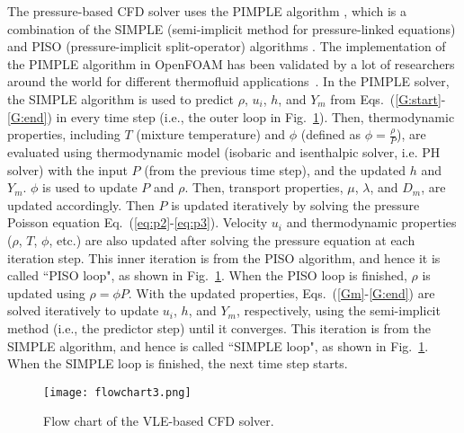 The pressure-based CFD solver uses the PIMPLE algorithm \cite{holzmann2016mathematics}, which is a combination of the SIMPLE (semi-implicit method for pressure-linked equations) \cite{patankar1983calculation} and PISO (pressure-implicit split-operator) algorithms \cite{issa1986solution}. The implementation of the PIMPLE algorithm in OpenFOAM has been validated by a lot of researchers around the world for different thermofluid applications~\cite{robertson2015validation, higuera2014three,gaikwad2019openfoam,gamet2020validation,de2017implementation,ashton2019verification}. %
In the PIMPLE solver, the SIMPLE algorithm is used to predict $\rho$, $u_i$, $h$, and $Y_m$ from Eqs.~(\ref{G:start}-\ref{G:end}) in every time step (i.e., the outer loop in Fig.~\ref{FC_CFD}). Then, thermodynamic properties, including $T$ (mixture temperature) and $\phi$ (defined as $\phi = \frac{\rho} {P}$), are evaluated using thermodynamic model (isobaric and isenthalpic solver, i.e. PH solver) with the input $P$ (from the previous time step), and the updated $h$ and $Y_m$. %
$\phi$ is used to update $P$ and $\rho$. Then, transport properties, $\mu$, $\lambda$, and $D_m$, are updated accordingly. Then $P$ is updated iteratively by solving the pressure Poisson equation Eq.~(\ref{eq:p2}-\ref{eq:p3}). Velocity $u_i$ and thermodynamic properties ($\rho$, $T$, $\phi$, etc.) are also updated after solving the pressure equation at each iteration step. This inner iteration is from the PISO algorithm, and hence it is called ``PISO loop", as shown in Fig.~\ref{FC_CFD}. When the PISO loop is finished, $\rho$ is updated using $ \rho = \phi P$. With the updated properties, Eqs.~(\ref{Gm}-\ref{G:end}) are solved iteratively to update $u_i$, $h$, and $Y_m$, respectively, using the semi-implicit method (i.e., the predictor step) until it converges. This iteration is from the SIMPLE algorithm, and hence is called ``SIMPLE loop", as shown in Fig.~\ref{FC_CFD}. When the SIMPLE loop is finished, the next time step starts.


\begin{figure}[htbp]
    \centering
    \texttt{[image: flowchart3.png]}
    \centering
    \caption{Flow chart of the VLE-based CFD solver.}
    \label{FC_CFD}
\end{figure}

